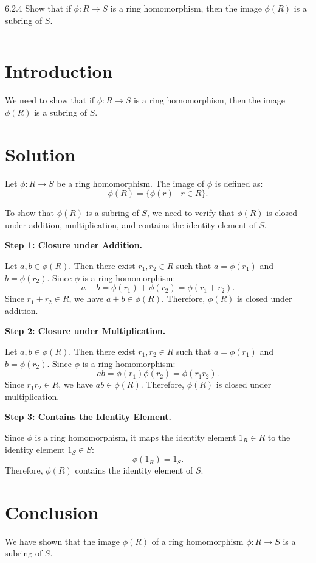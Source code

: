 \documentclass[12pt]{amsart}
\theoremstyle{definition}
\numberwithin{equation}{section}
\begin{document}
\newpage
\begin{exercise}{6.2.4} Show that if \(\phi : R \rightarrow S\) is a ring homomorphism, then the image \(\phi(R)\) is a subring of \(S\).

    \noindent\rule{\linewidth}{1pt}

    \section*{Introduction}
    We need to show that if \(\phi : R \rightarrow S\) is a ring homomorphism, then the image \(\phi(R)\) is a subring of \(S\).

    \section*{Solution}
    Let \(\phi : R \rightarrow S\) be a ring homomorphism. The image of \(\phi \) is defined as:
    \[
    \phi(R) = \{\phi(r) \mid r \in R\}.
    \]

    To show that \(\phi(R)\) is a subring of \(S\), we need to verify that \(\phi(R)\) is closed under addition, multiplication, and contains the identity element of \(S\).

    \noindent \textbf{Step 1: Closure under Addition.}

    Let \(a, b \in \phi(R)\). Then there exist \(r_1, r_2 \in R\) such that \(a = \phi(r_1)\) and \(b = \phi(r_2)\). Since \(\phi \) is a ring homomorphism:
    \[
    a + b = \phi(r_1) + \phi(r_2) = \phi(r_1 + r_2).
    \]
    Since \(r_1 + r_2 \in R\), we have \(a + b \in \phi(R)\). Therefore, \(\phi(R)\) is closed under addition.

    \noindent \textbf{Step 2: Closure under Multiplication.}

    Let \(a, b \in \phi(R)\). Then there exist \(r_1, r_2 \in R\) such that \(a = \phi(r_1)\) and \(b = \phi(r_2)\). Since \(\phi \) is a ring homomorphism:
    \[
    ab = \phi(r_1) \phi(r_2) = \phi(r_1 r_2).
    \]
    Since \(r_1 r_2 \in R\), we have \(ab \in \phi(R)\). Therefore, \(\phi(R)\) is closed under multiplication.

    \noindent \textbf{Step 3: Contains the Identity Element.}

    Since \(\phi \) is a ring homomorphism, it maps the identity element \(1_R \in R\) to the identity element \(1_S \in S\):
    \[
    \phi(1_R) = 1_S.
    \]
    Therefore, \(\phi(R)\) contains the identity element of \(S\).

    \section*{Conclusion}
    We have shown that the image \(\phi(R)\) of a ring homomorphism \(\phi : R \rightarrow S\) is a subring of \(S\).

\end{exercise}
\end{document}
